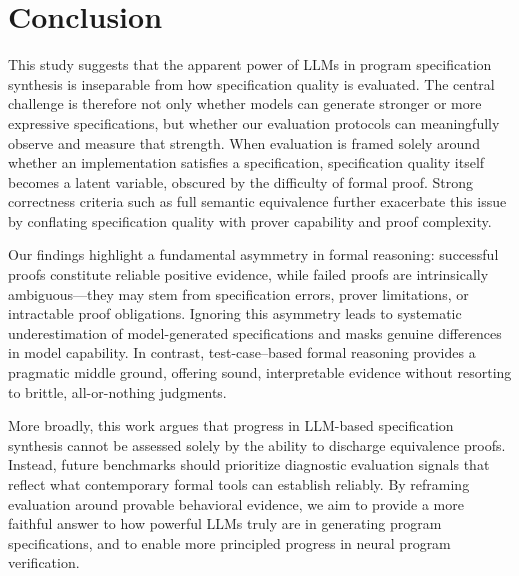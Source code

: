 \documentclass{article}
\theoremstyle{plain}
\theoremstyle{definition}
\theoremstyle{remark}
\begin{document}
\section{Conclusion}


This study suggests that the apparent power of LLMs in program specification synthesis is inseparable from how specification quality is evaluated. The central challenge is therefore not only whether models can generate stronger or more expressive specifications, but whether our evaluation protocols can meaningfully observe and measure that strength. When evaluation is framed solely around whether an implementation satisfies a specification, specification quality itself becomes a latent variable, obscured by the difficulty of formal proof. Strong correctness criteria such as full semantic equivalence further exacerbate this issue by conflating specification quality with prover capability and proof complexity.

Our findings highlight a fundamental asymmetry in formal reasoning: successful proofs constitute reliable positive evidence, while failed proofs are intrinsically ambiguous—they may stem from specification errors, prover limitations, or intractable proof obligations. Ignoring this asymmetry leads to systematic underestimation of model-generated specifications and masks genuine differences in model capability. In contrast, test-case--based formal reasoning provides a pragmatic middle ground, offering sound, interpretable evidence without resorting to brittle, all-or-nothing judgments.

More broadly, this work argues that progress in LLM-based specification synthesis cannot be assessed solely by the ability to discharge equivalence proofs. Instead, future benchmarks should prioritize diagnostic evaluation signals that reflect what contemporary formal tools can establish reliably. By reframing evaluation around provable behavioral evidence, we aim to provide a more faithful answer to how powerful LLMs truly are in generating program specifications, and to enable more principled progress in neural program verification.
\end{document}
